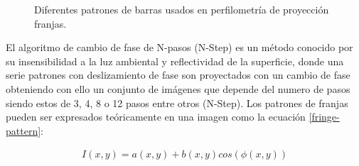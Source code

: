\documentclass[10pt,letterpaper]{article}
\begin{document}
\begin{figure}[H]
      \begin{center}
        \caption{Diferentes patrones de barras usados en perfilometría de proyección franjas.}
        \label{tif373839}
      \end{center}
\end{figure}


El algoritmo de cambio de fase de N-pasos (N-Step) es un método conocido por su insensibilidad a la luz ambiental y reflectividad de la superficie\cite{Tao:Chen}, donde una serie patrones con deslizamiento de fase son proyectados con un cambio de fase obteniendo con ello un conjunto de imágenes que depende del numero de pasos siendo estos de 3, 4, 8 o 12 pasos entre otros (N-Step). Los patrones de franjas pueden ser expresados teóricamente en una imagen como la ecuación \ref{fringe-pattern}: %

\begin{eqnarray}
\label{fringe-pattern}
I(x,y)=a(x,y)+b(x,y)cos(\phi (x,y))
\end{eqnarray}
\end{document}
